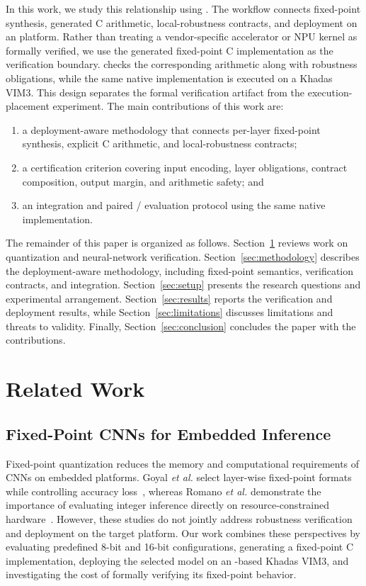 In this work, we study this relationship using \PreQBMC{}. The workflow connects fixed-point synthesis, generated C arithmetic, local-robustness contracts, and deployment on an \AAOS{} platform. Rather than treating a vendor-specific accelerator or NPU kernel as formally verified, we use the generated fixed-point C implementation as the verification boundary. \ESBMC{} checks the corresponding arithmetic along with robustness obligations, while the same native implementation is executed on a Khadas VIM3. This design separates the formal verification artifact from the execution-placement experiment. The main contributions of this work are:

\begin{enumerate}[leftmargin=*,nosep]
  \item a deployment-aware methodology that connects per-layer fixed-point synthesis, explicit C arithmetic, and local-robustness contracts;
  \item a certification criterion covering input encoding, layer obligations, contract composition, output margin, and arithmetic safety; and
  \item an \AAOS{} integration and paired \Athree{}/\Aseven{} evaluation protocol using the same native implementation.
\end{enumerate}

The remainder of this paper is organized as follows. Section~\ref{sec:related} reviews work on quantization and neural-network verification. Section~\ref{sec:methodology} describes the deployment-aware methodology, including fixed-point semantics, verification contracts, and \AAOS{} integration. Section~\ref{sec:setup} presents the research questions and experimental arrangement. Section~\ref{sec:results} reports the verification and deployment results, while Section~\ref{sec:limitations} discusses limitations and threats to validity. Finally, Section~\ref{sec:conclusion} concludes the paper with the contributions.


\section{Related Work}
\label{sec:related}

\subsection{Fixed-Point CNNs for Embedded Inference}



Fixed-point quantization reduces the memory and computational requirements of CNNs on embedded platforms. Goyal \emph{et al.} select layer-wise fixed-point formats while controlling accuracy loss~\cite{Goyal2021FixedPointCNN}, whereas Romano \emph{et al.} demonstrate the importance of evaluating integer inference directly on resource-constrained hardware~\cite{Romano2026NeuroC}. However, these studies do not jointly address robustness verification and deployment on the target platform. Our work combines these perspectives by evaluating predefined 8-bit and 16-bit configurations, generating a fixed-point C implementation, deploying the selected model on an \AAOS{}-based Khadas VIM3, and investigating the cost of formally verifying its fixed-point behavior.

